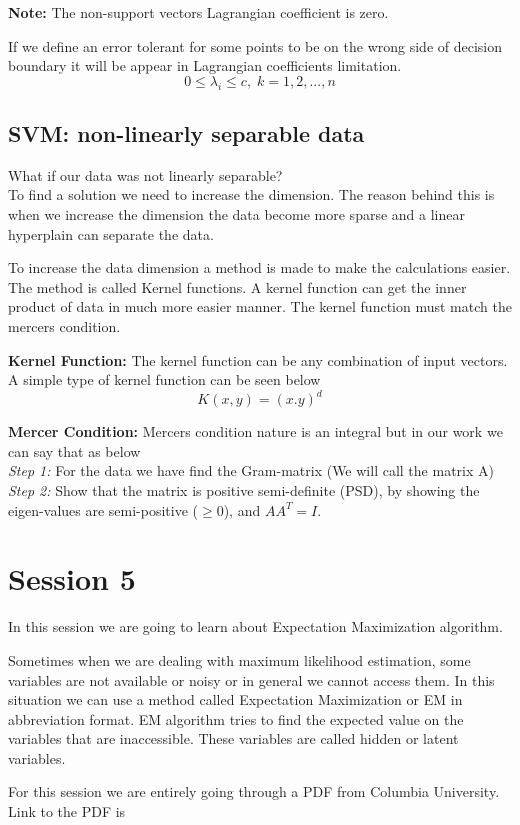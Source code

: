 \documentclass{article}
\begin{document}
\textbf{Note:} The non-support vectors Lagrangian coefficient is zero. \par
If we define an error tolerant for some points to be on the wrong side of decision boundary it will be appear in Lagrangian coefficients limitation.
\begin{equation}
       0 \leq \lambda_i \leq c, \; k = 1,2,...,n
\end{equation}

\subsection{SVM: non-linearly separable data}
What if our data was not linearly separable? \\ To find a solution we need to increase the dimension. The reason behind this is when we increase the dimension the data become more sparse and a linear hyperplain can separate the data. \par
To increase the data dimension a method is made to make the calculations easier. The method is called Kernel functions. A kernel function can get the inner product of data in much more easier manner. The kernel function must match the mercers condition. \par
\textbf{Kernel Function:} The kernel function can be any combination of input vectors. A simple type of kernel function can be seen below
\begin{equation}
    K(x,y) = (x.y)^d
\end{equation} \par
\textbf{Mercer Condition:} Mercers condition nature is an integral but in our work we can say that as below \\
\textit{Step 1:} For the data we have find the Gram-matrix (We will call the matrix A)\\
\textit{Step 2:} Show that the matrix is positive semi-definite (PSD), by showing the eigen-values are semi-positive ($\geq 0$), and $ A A^T = I$.

\section{Session 5}
In this session we are going to learn about Expectation Maximization algorithm. \par
Sometimes when we are dealing with maximum likelihood estimation, some variables are not available or noisy or in general we cannot access them. In this situation we can use a method called Expectation Maximization or EM in abbreviation format. EM algorithm tries to find the expected value on the variables that are inaccessible. These variables are called hidden or latent variables. \par
For this session we are entirely going through a PDF from Columbia University. Link to the PDF is 
\end{document}
